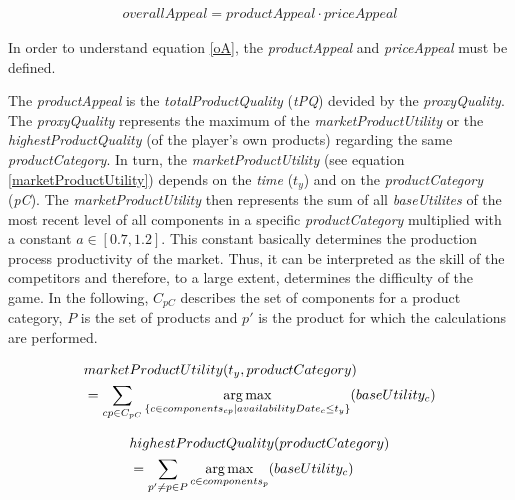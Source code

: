 \begin{equation}
\label{oA}
\begin{aligned}
overallAppeal = productAppeal \cdot priceAppeal
\end{aligned}
\end{equation}

In order to understand equation \ref{oA}, the \textit{productAppeal} and \textit{priceAppeal} must be defined.

The \textit{productAppeal} is the \textit{totalProductQuality} (\textit{\gls{tPQ}}) devided by the \textit{proxyQuality}.
The \textit{proxyQuality} represents the maximum of the \textit{marketProductUtility} or the \textit{highestProductQuality} (of the player's own products) regarding the same \textit{productCategory}.
In turn, the \textit{marketProductUtility} (see equation \ref{marketProductUtility}) depends on the \textit{time} ($t_y$) and on the \textit{productCategory} (\textit{\gls{pC}}). The \textit{marketProductUtility} then represents the sum of all \textit{baseUtilites} of the most recent level of all components in a specific \textit{productCategory} multiplied with a constant $a \in [0.7, 1.2]$. 
This constant basically determines the production process productivity of the market. Thus, it can be interpreted as the skill of the competitors and therefore, to a large extent, determines the difficulty of the game. In the following, $C_{pC}$ describes the set of components for a product category, $P$ is the set of products and $p'$ is the product for which the calculations are performed.

\begin{equation}
\label{marketProductUtility}
\begin{aligned}
    & marketProductUtility(t_y, productCategory) \\
    & = \sum_{cp \in C_{pC}} \operatorname*{arg\,max}\limits_{\{c \in components_{cp}| availabilityDate_c \leq t_y\}}(baseUtility_c)\\
\end{aligned}    
\end{equation}

\begin{equation}
\label{highestProductQuality}
\begin{aligned}
    & highestProductQuality(productCategory) \\
    & = \sum_{p' \neq p \in P} \operatorname*{arg\,max}\limits_{c \in components_p}(baseUtility_c) \\
\end{aligned}    
\end{equation}

